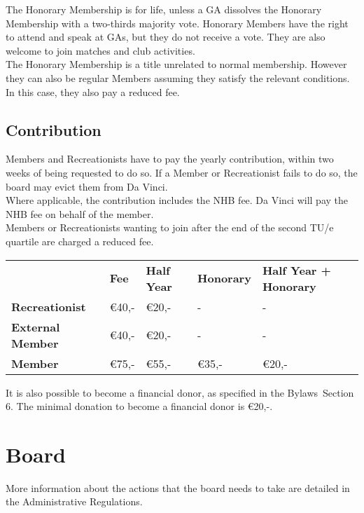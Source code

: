 \documentclass[a4paper]{article}
\newcommand{\Abr}{Administrative Regulations} %
\newcommand{\Asta}{Bylaws} %
\begin{document}
The Honorary Membership is for life, unless a GA dissolves the Honorary Membership with a two-thirds majority vote. Honorary Members have the right to attend and speak at GAs, but they do not receive a vote. They are also welcome to join matches and club activities. \\

The Honorary Membership is a title unrelated to normal membership. However they can also be regular Members assuming they satisfy the relevant conditions. In this case, they also pay a reduced fee.

\subsection{Contribution}
Members and Recreationists have to pay the yearly contribution, within two weeks of being requested to do so. If a Member or Recreationist fails to do so, the board may evict them from Da Vinci. \\

Where applicable, the contribution includes the NHB fee. Da Vinci will pay the NHB fee on behalf of the member. \\

Members or Recreationists wanting to join after the end of the second TU/e quartile are charged a reduced fee. \\


\bigskip
\begin{tabular}{lllll}
                         & \textbf{Fee} & \textbf{Half Year} & \textbf{Honorary} & \textbf{Half Year + Honorary} \\
\textbf{Recreationist}   & €40,-        & €20,-              & -                 & -                             \\
\textbf{External Member} & €40,-        & €20,-              & -                 & -                             \\
\textbf{Member}          & €75,-        & €55,-              & €35,-             & €20,-                        
\end{tabular}

\bigskip

It is also possible to become a financial donor, as specified in the \Asta\ Section 6. The minimal donation to become a financial donor is €20,-.

\section{Board}
More information about the actions that the board needs to take are detailed in the \Abr .
\end{document}
